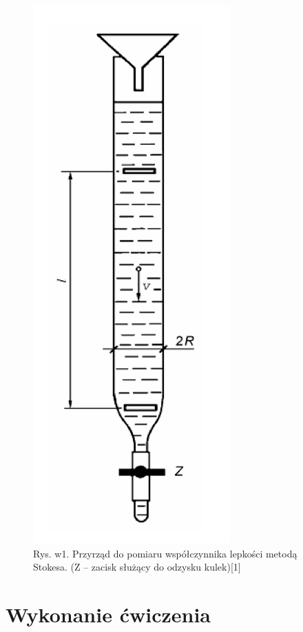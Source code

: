 \documentclass{article}
\begin{document}
\begin{figure}[h]
\centering
\captionsetup{width=.7\linewidth}
\includegraphics[scale=0.4]{rysunek1.png}
\caption{Rys. w1. Przyrząd do pomiaru współczynnika lepkości metodą Stokesa. (Z – zacisk służący do odzysku kulek)[1]}
\label{fig:example}
\end{figure}

\section{Wykonanie ćwiczenia}
\end{document}
